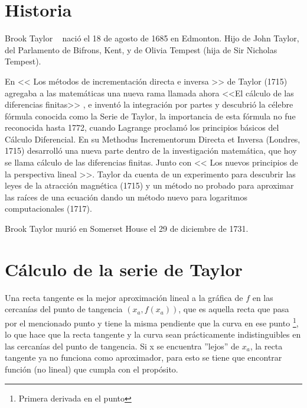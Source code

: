 

\section{Historia}
\label{2:sec:1}
  Brook Taylor ~\cite{URL:XML1} naci\'o el 18 de agosto de 1685 en Edmonton. Hijo de John Taylor,
del Parlamento de Bifrons, Kent, y de Olivia Tempest (hija de Sir Nicholas Tempest).

  En << Los m\'etodos de incrementaci\'on directa e inversa >> de Taylor (1715) agregaba a las
matem\'aticas una nueva rama llamada ahora <<El c\'alculo de las diferencias finitas>> ,
e invent\'o la integraci\'on por partes y descubri\'o la c\'elebre f\'ormula conocida como la Serie de Taylor,
la importancia de esta f\'ormula no fue reconocida hasta 1772, cuando Lagrange proclam\'o los
principios b\'asicos del C\'alculo Diferencial. En su Methodus Incrementorum Directa et Inversa
(Londres, 1715) desarroll\'o una nueva parte dentro de la investigaci\'on matem\'atica,
que hoy se llama c\'alculo de las diferencias finitas. Junto con << Los nuevos principios de
la perspectiva lineal >>. Taylor da cuenta de un experimento para descubrir las leyes de la
atracci\'on magn\'etica (1715) y un m\'etodo no probado para aproximar las ra\'ices de una ecuaci\'on
dando un m\'etodo nuevo para logaritmos computacionales (1717).

  Brook Taylor muri\'o en Somerset House el 29 de diciembre de 1731.

\section{C\'alculo de la serie de Taylor}
\label{2:sec:2}

  Una recta tangente es la mejor aproximaci\'on lineal a la gr\'afica de $f$ en las cercan\'ias del punto de tangencia $(x_{a}, f(x_{a}))$, que es aquella recta que pasa
por el mencionado punto y tiene la misma pendiente que la curva en ese punto \footnote{Primera derivada en el punto}, lo que hace que la recta tangente y la curva sean pr\'acticamente
indistinguibles en las cercan\'ias del punto de tangencia. Si x se encuentra ''lejos'' de $x_{a}$, la recta tangente ya no funciona como aproximador, para esto se tiene que encontrar funci\'on
(no lineal) que cumpla con el prop\'osito.

